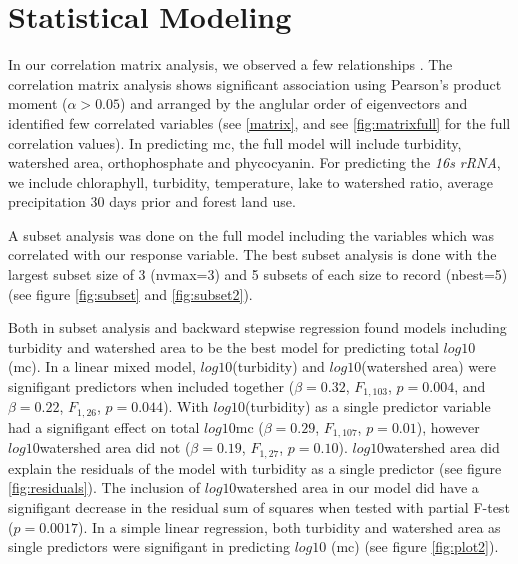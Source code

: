 \clearpage

\section{Statistical Modeling}

In our correlation matrix analysis, we observed a few relationships  . The correlation matrix analysis shows significant association using Pearson's product moment ($\alpha>0.05$) and arranged by the anglular order of eigenvectors and identified few correlated variables (see \ref{matrix}, and see \ref{fig:matrixfull} for the full correlation values). In predicting \gls{mc}, the full model will include turbidity, watershed area, orthophosphate and phycocyanin. For predicting the \emph{16s rRNA}, we include chloraphyll, turbidity, temperature, lake to watershed ratio, average precipitation 30 days prior and forest land use.


A subset analysis was done on the full model including the variables  which was correlated with our response variable. The best subset analysis is done with the largest subset size of 3 (nvmax=3) and 5 subsets of each size to record (nbest=5) (see figure \ref{fig:subset} and \ref{fig:subset2}).

Both in subset analysis and backward stepwise regression found models including turbidity and watershed area to be  the best model for predicting total $log10$ (\gls{mc}). In a linear mixed model, $log10$(turbidity) and $log10$(watershed area) were signifigant predictors when included together ($\beta=0.32$, $F_{{1,103}}$, $p=0.004$, and $\beta=0.22$, $F_{{1,26}}$, $p=0.044$). With $log10$(turbidity) as a single predictor variable had a signifigant effect on total $log10$\gls{mc} ($\beta=0.29$, $F_{{1,107}}$, $p=0.01$), however $log10$watershed area did not ($\beta=0.19$, $F_{{1,27}}$, $p=0.10$).  $log10$watershed area did explain the residuals of the model with turbidity as a single predictor (see figure \ref{fig:residuals}). The inclusion of $log10$watershed area in our model did have a signifigant decrease in the residual sum of squares when tested with partial F-test ($p=0.0017$). In a simple linear regression, both turbidity and watershed area as single predictors were signifigant in predicting $log10$ (\gls{mc}) (see figure \ref{fig:plot2}).


